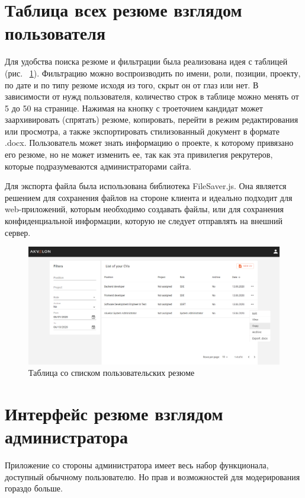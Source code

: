 \documentclass[14pt, a4paper]{diplom}
\begin{document}
\section{Таблица всех резюме взглядом пользователя}

Для удобства поиска резюме и фильтрации была реализована идея с таблицей (рис. ~\ref{14}). Фильтрацию можно воспроизводить по имени, роли, позиции,
проекту, по дате и по типу резюме исходя из того, скрыт он от глаз или нет. В зависимости от нужд пользователя, количество строк в таблице можно менять от 5 до 50 на странице.
Нажимая на кнопку с троеточием кандидат может заархивировать (спрятать) резюме, копировать, перейти в режим редактирования или просмотра, а также экспортировать
стилизованный документ в формате .docx. Пользователь может знать информацию о проекте, к которому привязано его резюме, но не может изменить ее, так как эта привилегия рекрутеров, которые подразумеваются
администраторами сайта.

Для экспорта файла была использована библиотека FileSaver.js. Она является решением для сохранения файлов на стороне клиента и идеально подходит для web-приложений, которым необходимо создавать файлы, или для сохранения конфиденциальной информации, которую не следует отправлять на внешний сервер.

\begin{figure}[!ht]
\centering
\includegraphics[width=1\textwidth]{resources/cvlistuser.png}
\caption{Таблица со списком пользовательских резюме}
\label{14}
\end{figure}

\section{Интерфейс резюме взглядом администратора}

Приложение со стороны администратора имеет весь набор функционала, доступный обычному пользователю. Но прав и возможностей для модерирования гораздо больше.
\end{document}
